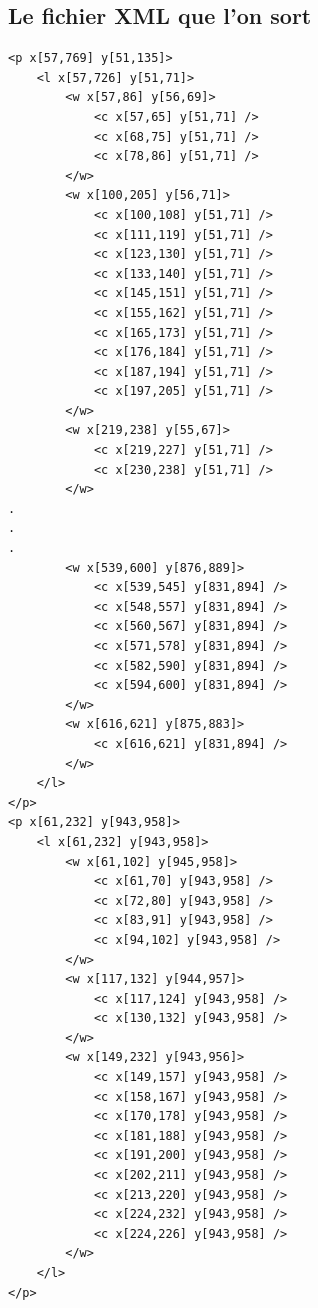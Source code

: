 \documentclass[a4paper,12pt]{report}
\begin{document}
\pagebreak

\subsection{Le fichier XML que l'on sort} %
\label{sub:le_fichier_xml_que_l_on_sort}
\begin{lstlisting}
<p x[57,769] y[51,135]>
	<l x[57,726] y[51,71]>
		<w x[57,86] y[56,69]>
			<c x[57,65] y[51,71] />
			<c x[68,75] y[51,71] />
			<c x[78,86] y[51,71] />
		</w>
		<w x[100,205] y[56,71]>
			<c x[100,108] y[51,71] />
			<c x[111,119] y[51,71] />
			<c x[123,130] y[51,71] />
			<c x[133,140] y[51,71] />
			<c x[145,151] y[51,71] />
			<c x[155,162] y[51,71] />
			<c x[165,173] y[51,71] />
			<c x[176,184] y[51,71] />
			<c x[187,194] y[51,71] />
			<c x[197,205] y[51,71] />
		</w>
		<w x[219,238] y[55,67]>
			<c x[219,227] y[51,71] />
			<c x[230,238] y[51,71] />
		</w>
.
.
.
		<w x[539,600] y[876,889]>
			<c x[539,545] y[831,894] />
			<c x[548,557] y[831,894] />
			<c x[560,567] y[831,894] />
			<c x[571,578] y[831,894] />
			<c x[582,590] y[831,894] />
			<c x[594,600] y[831,894] />
		</w>
		<w x[616,621] y[875,883]>
			<c x[616,621] y[831,894] />
		</w>
	</l>
</p>
<p x[61,232] y[943,958]>
	<l x[61,232] y[943,958]>
		<w x[61,102] y[945,958]>
			<c x[61,70] y[943,958] />
			<c x[72,80] y[943,958] />
			<c x[83,91] y[943,958] />
			<c x[94,102] y[943,958] />
		</w>
		<w x[117,132] y[944,957]>
			<c x[117,124] y[943,958] />
			<c x[130,132] y[943,958] />
		</w>
		<w x[149,232] y[943,956]>
			<c x[149,157] y[943,958] />
			<c x[158,167] y[943,958] />
			<c x[170,178] y[943,958] />
			<c x[181,188] y[943,958] />
			<c x[191,200] y[943,958] />
			<c x[202,211] y[943,958] />
			<c x[213,220] y[943,958] />
			<c x[224,232] y[943,958] />
			<c x[224,226] y[943,958] />
		</w>
	</l>
</p>	
\end{lstlisting}
\end{document}
